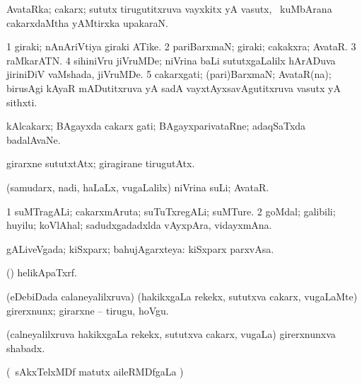 {{{{{{\bentry
{} 
\gl{\nA}
\expl{}
\bmng
AvataRka; cakarx; sututx tirugutitxruva vayxkitx yA vasutx, \kanmu\ kuMbArana cakarxdaMtha yAMtirxka upakaraN. 
\emng
\eentry

\bentry
{} 
\gl{\nA}
\expl{}
\bmng
\bnum
\num{1} giraki; nAnAriVtiya giraki ATike. 
\num{2} pariBarxmaN; giraki; cakakxra; AvataR. 
\num{3} raMkarATN. 
\num{4} sihiniVru jiVruMDe; niVrina baLi sututxgaLalilx hArADuva jiriniDiV vaMshada, jiVruMDe. 
\num{5} cakarxgati; (pari)BarxmaN; AvataR(na); birusAgi kAyaR mADutitxruva yA sadA vayxtAyxsavAgutitxruva vasutx yA sithxti. 
\enum
\emng

\noindent
\gl{\pagu}
\expl{}
\bmng
{} kAlcakarx; BAgayxda cakarx gati; BAgayxparivataRne; adaqSaTxda badalAvaNe. 
\emng
\eentry

\bentry
{} 
\gl{\kirxvi}
\expl{}
\bmng
girarxne sututxtAtx; giragirane tirugutAtx. 
\emng
\eentry

\bentry
{} 
\gl{\nA}
\expl{}
\bmng
(samudarx, nadi, haLaLx, \mo vugaLalilx) niVrina suLi; AvataR. 
\emng
\eentry

\bentry
{} 
\gl{\nA}
\expl{}
\bmng
\bnum
\num{1} suMTragALi; cakarxmAruta; suTuTxregALi; suMTure. 
\num{2} goMdal; galibili; huyilu; koVlAhal; sadudxgadadxlda vAyxpAra, vidayxmAna. 
\enum
\emng

\noindent
\gl{\pagu}
\expl{}
\bmng
{} 
\emng
\eentry

\bentry
{}
\gl{\gu}
\expl{}
\bmng
gALiveVgada; kiSxparx; bahujAgarxteya:  kiSxparx parxvAsa. 
\emng
\eentry

\bentry
{} 
\gl{\nA}
\expl{}
\bmng
(\AmA) helikApaTxrf. 
\emng
\eentry

\bentry
{} 
\gl{\akirx}
\bmng
(eDebiDada calaneyalilxruva) (hakikxgaLa rekekx, sututxva cakarx, \mo vugaLaMte) girerxnunx; girarxne -- tirugu, hoVgu. 
\emng
\eentry

\bentry
{} 
\gl{\nA}
\expl{}
\bmng
(calneyalilxruva hakikxgaLa rekekx, sututxva cakarx, \mo vugaLa) girerxnunxva shabadx. 
\emng
\eentry

\bentry
{} 
\gl{\kirx}
\expl{}
\bmng
(\kanmu\ sAkxTelxMDf matutx aileRMDfgaLa \pArxM) 
\emng

}}}}}}
